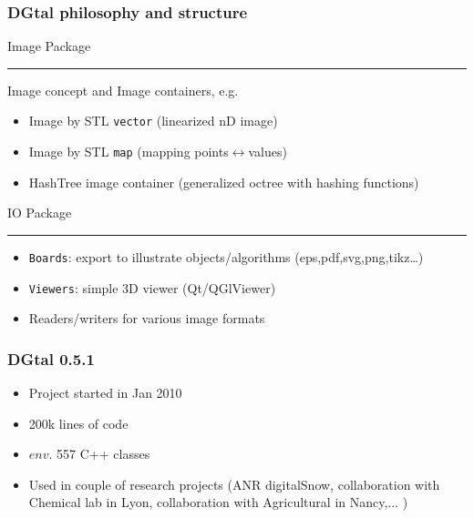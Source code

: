 \documentclass[8pt]{beamer}
\newcommand{\HH}{ \vspace{0.5pt}\hrule}
\begin{document}
\begin{frame}
  \frametitle{DGtal philosophy and structure}

  \begin{alertblock}{\centering Image Package\HH}
    Image concept and Image containers, e.g.
    \begin{itemize}
    \item Image by STL \texttt{vector} (linearized nD image)
    \item Image by STL \texttt{map} (mapping points$\leftrightarrow$values)
    \item HashTree image container (generalized octree with hashing functions)
    \end{itemize}
  \end{alertblock}
  

  \begin{alertblock}{\centering IO Package\HH}
    \small
    \begin{itemize}
    \item \texttt{Boards}: export to illustrate objects/algorithms (eps,pdf,svg,png,tikz\ldots)  
    \item \texttt{Viewers}:  simple 3D viewer (Qt/QGlViewer)
    \item Readers/writers for various image formats
    \end{itemize}
  \end{alertblock}
\end{frame}
\begin{frame}%
  \frametitle{DGtal 0.5.1}

\begin{itemize}
\item Project started in Jan 2010
\item 200k lines of code
\item $env.$ 557 C++ classes 
\item Used in couple of research projects (ANR digitalSnow,
  collaboration with Chemical lab in Lyon, collaboration with
  Agricultural in Nancy,... )
\end{itemize}
  
\end{frame}


\end{document}

